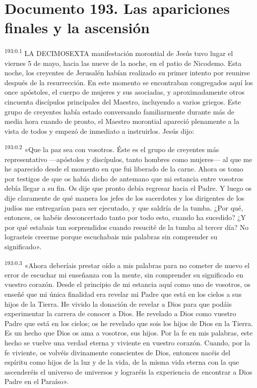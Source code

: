 \chapter{Documento 193. Las apariciones finales y la ascensión}
\par 
\textsuperscript{193:0.1} LA DECIMOSEXTA manifestación morontial de Jesús tuvo lugar el viernes 5 de mayo, hacia las nueve de la noche, en el patio de Nicodemo. Esta noche, los creyentes de Jerusalén habían realizado su primer intento por reunirse después de la resurrección. En este momento se encontraban congregados aquí los once apóstoles, el cuerpo de mujeres y sus asociadas, y aproximadamente otros cincuenta discípulos principales del Maestro, incluyendo a varios griegos. Este grupo de creyentes había estado conversando familiarmente durante más de media hora cuando de pronto, el Maestro morontial apareció plenamente a la vista de todos y empezó de inmediato a instruirlos. Jesús dijo:

\par 
\textsuperscript{193:0.2} «Que la paz sea con vosotros. Éste es el grupo de creyentes más representativo ---apóstoles y discípulos, tanto hombres como mujeres--- al que me he aparecido desde el momento en que fui liberado de la carne. Ahora os tomo por testigos de que os había dicho de antemano que mi estancia entre vosotros debía llegar a su fin. Os dije que pronto debía regresar hacia el Padre. Y luego os dije claramente de qué manera los jefes de los sacerdotes y los dirigentes de los judíos me entregarían para ser ejecutado, y que saldría de la tumba. ¿Por qué, entonces, os habéis desconcertado tanto por todo esto, cuando ha sucedido? ¿Y por qué estabais tan sorprendidos cuando resucité de la tumba al tercer día? No lograsteis creerme porque escuchabais mis palabras sin comprender su significado».

\par 
\textsuperscript{193:0.3} «Ahora deberíais prestar oído a mis palabras para no cometer de nuevo el error de escuchar mi enseñanza con la mente, sin comprender su significado en vuestro corazón. Desde el principio de mi estancia aquí como uno de vosotros, os enseñé que mi única finalidad era revelar mi Padre que está en los cielos a sus hijos de la Tierra. He vivido la donación de revelar a Dios para que podáis experimentar la carrera de conocer a Dios. He revelado a Dios como vuestro Padre que está en los cielos; os he revelado que sois los hijos de Dios en la Tierra. Es un hecho que Dios os ama a vosotros, sus hijos. Por la fe en mis palabras, este hecho se vuelve una verdad eterna y viviente en vuestro corazón. Cuando, por la fe viviente, os volvéis divinamente conscientes de Dios, entonces nacéis del espíritu como hijos de la luz y de la vida, de la misma vida eterna con la que ascenderéis el universo de universos y lograréis la experiencia de encontrar a Dios Padre en el Paraíso».

